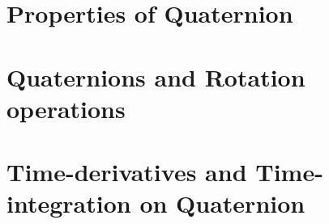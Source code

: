 \section{Properties of Quaternion}
\label{sec:prop_of_quat}

\section{Quaternions and Rotation operations}
\label{sec:quat_and_rot}

\section{Time-derivatives and Time-integration on Quaternion}
\label{sec:time_on_quat}
